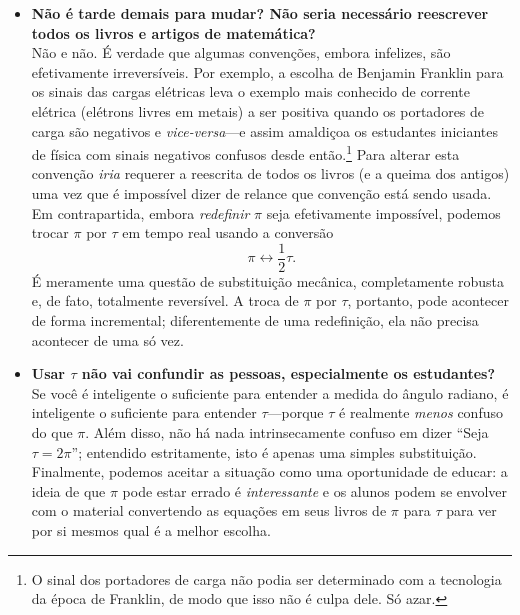 \begin{itemize}
  \item \textbf{Não é tarde demais para mudar? Não seria necessário reescrever todos os livros e artigos de matemática?} \\ Não e não. É verdade que algumas convenções, embora infelizes, são efetivamente irreversíveis. Por exemplo, a escolha de Benjamin Franklin para os sinais das cargas elétricas leva o exemplo mais conhecido de corrente elétrica (elétrons livres em metais) a ser positiva quando os portadores de carga são negativos e \emph{vice-versa}---e assim amaldiçoa os estudantes iniciantes de física com sinais negativos confusos desde então.\footnote{O sinal dos portadores de carga não podia ser determinado com a tecnologia da época de Franklin, de modo que isso não é culpa dele. Só azar.} Para alterar esta convenção \emph{iria} requerer a reescrita de todos os livros (e a queima dos antigos) uma vez que é impossível dizer de relance que convenção está sendo usada. Em contrapartida, embora \emph{redefinir} $\pi$ seja efetivamente impossível, podemos trocar $\pi$ por $\tau$ em tempo real usando a conversão \[ \pi \leftrightarrow \textstyle{\frac{1}{2}}\tau. \] É meramente uma questão de substituição mecânica, completamente robusta e, de fato, totalmente reversível. A troca de $\pi$ por $\tau$, portanto, pode acontecer de forma incremental; diferentemente de uma redefinição, ela não precisa acontecer de uma só vez.

  \item \textbf{Usar $\tau$ não vai confundir as pessoas, especialmente os estudantes?} \\ Se você é inteligente o suficiente para entender a medida do ângulo radiano, é inteligente o suficiente para entender $\tau$---porque $\tau$ é realmente \emph{menos} confuso do que $\pi$. Além disso, não há nada intrinsecamente confuso em dizer ``Seja $\tau = 2\pi$''; entendido estritamente, isto é apenas uma simples substituição. Finalmente, podemos aceitar a situação como uma oportunidade de educar: a ideia de que $\pi$ pode estar errado é \emph{interessante} e os alunos podem se envolver com o material convertendo as equações em seus livros de $\pi$ para $\tau$ para ver por si mesmos qual é a melhor escolha.


\end{itemize}
